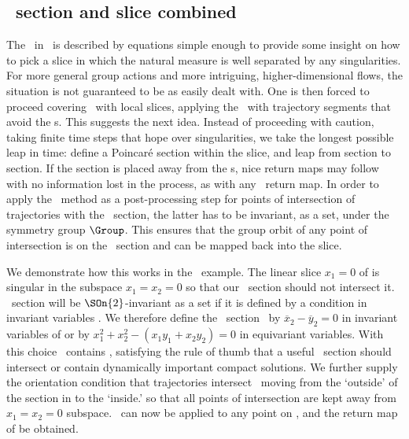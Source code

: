 \subsection{\label{s:laserMFnum}\Poincare\ section and slice combined}

The \sset\ in \cLe\ is described by equations simple enough
to provide some insight on how to pick a slice in which the
natural measure is well separated by any singularities. For
more general group actions and more intriguing,
higher-dimensional flows, the situation is not guaranteed to
be as easily dealt with. One is then forced to proceed
covering \statesp\ with local slices, applying the \mframes\
with trajectory segments that avoid the {\sset s}. This
suggests the next idea. Instead of proceeding with caution,
taking finite time steps that hope over singularities, we
take the longest possible leap in time: define a Poincar\'e
section within the slice, and leap from section to section.
If the section is placed away from the {\sset s}, nice return
maps may follow with no information lost in the process, as
with any \Poincare\ return map. In order to apply the
\mframes\ method as a post-processing step for points of
intersection of trajectories with the \Poincare\ section, the
latter has to be in\-vari\-ant, as a set, under the symmetry
group $\Group$. This ensures that the group orbit of any
point of intersection is on the \Poincare\ section and can be
mapped back into the slice.

We demonstrate how this works in the \cLe\ example. The
linear slice $x_1=0$ of  is singular
in the subspace $x_1=x_2=0$ so that our \Poincare\ section
should not intersect it. \Poincare\ section will be
$\SOn{2}$-in\-vari\-ant as a set if it is defined by a
condition in in\-vari\-ant variables . We
therefore define the \Poincare\ section  \PoincS\ by
$\overline{x}_2-\overline{y}_2=0$
in in\-vari\-ant variables of  or by
$x_1^2+x_2^2-(x_1 y_1 + x_2 y_2)=0$ in equi\-vari\-ant
variables. With this choice \PoincS\ contains ,
satisfying the rule of thumb that a useful  \Poincare\
section should intersect or contain dynamically important
compact solutions. We further supply the orientation
condition that trajectories intersect \PoincS\ moving from
the `outside' of the section in  to
the `inside.' so that all points of intersection are kept
away from $x_1=x_2=0$ subspace. \Mframes\ can now be applied
to any point on \PoincS,
and the return map of \reffig{fig:CLEmf} be obtained.

